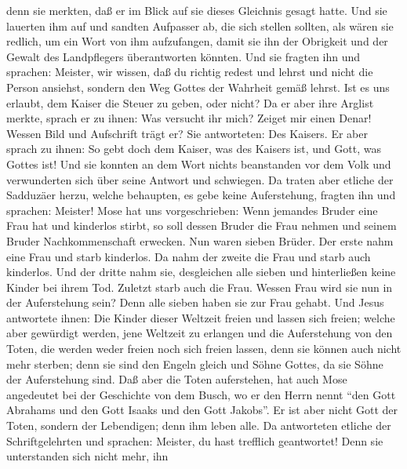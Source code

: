 denn sie merkten, daß er im Blick auf sie dieses Gleichnis gesagt hatte.
 Und sie lauerten ihm auf und sandten Aufpasser ab, die
sich stellen sollten, als wären sie redlich, um ein Wort von ihm
aufzufangen, damit sie ihn der Obrigkeit und der Gewalt des Landpflegers
überantworten könnten.  Und sie fragten ihn und sprachen:
Meister, wir wissen, daß du richtig redest und lehrst und nicht die
Person ansiehst, sondern den Weg Gottes der Wahrheit gemäß lehrst.
 Ist es uns erlaubt, dem Kaiser die Steuer zu geben, oder
nicht?  Da er aber ihre Arglist merkte, sprach er zu
ihnen: Was versucht ihr mich?  Zeiget mir einen Denar!
Wessen Bild und Aufschrift trägt er? Sie antworteten: Des Kaisers.
 Er aber sprach zu ihnen: So gebt doch dem Kaiser, was
des Kaisers ist, und Gott, was Gottes ist!  Und sie
konnten an dem Wort nichts beanstanden vor dem Volk und verwunderten
sich über seine Antwort und schwiegen.  Da traten aber
etliche der Sadduzäer herzu, welche behaupten, es gebe keine
Auferstehung, fragten ihn  und sprachen: Meister! Mose
hat uns vorgeschrieben: Wenn jemandes Bruder eine Frau hat und kinderlos
stirbt, so soll dessen Bruder die Frau nehmen und seinem Bruder
Nachkommenschaft erwecken.  Nun waren sieben Brüder. Der
erste nahm eine Frau und starb kinderlos.  Da nahm der
zweite die Frau und starb auch kinderlos.  Und der dritte
nahm sie, desgleichen alle sieben und hinterließen keine Kinder bei
ihrem Tod.  Zuletzt starb auch die Frau. 
Wessen Frau wird sie nun in der Auferstehung sein? Denn alle sieben
haben sie zur Frau gehabt.  Und Jesus antwortete ihnen:
Die Kinder dieser Weltzeit freien und lassen sich freien;
 welche aber gewürdigt werden, jene Weltzeit zu erlangen
und die Auferstehung von den Toten, die werden weder freien noch sich
freien lassen,  denn sie können auch nicht mehr sterben;
denn sie sind den Engeln gleich und Söhne Gottes, da sie Söhne der
Auferstehung sind.  Daß aber die Toten auferstehen, hat
auch Mose angedeutet bei der Geschichte von dem Busch, wo er den Herrn
nennt ``den Gott Abrahams und den Gott Isaaks und den Gott Jakobs''.
 Er ist aber nicht Gott der Toten, sondern der
Lebendigen; denn ihm leben alle.  Da antworteten etliche
der Schriftgelehrten und sprachen: Meister, du hast trefflich
geantwortet!  Denn sie unterstanden sich nicht mehr, ihn
